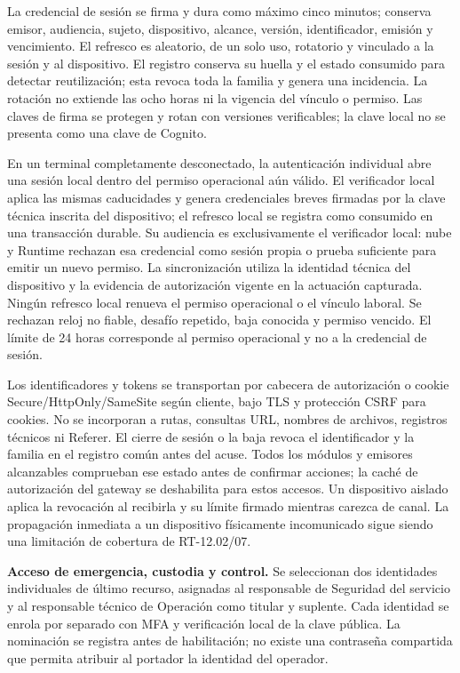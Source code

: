 La credencial de sesión se firma y dura como máximo cinco minutos; conserva emisor, audiencia, sujeto, dispositivo, alcance, versión, identificador, emisión y vencimiento. El refresco es aleatorio, de un solo uso, rotatorio y vinculado a la sesión y al dispositivo. El registro conserva su huella y el estado consumido para detectar reutilización; esta revoca toda la familia y genera una incidencia. La rotación no extiende las ocho horas ni la vigencia del vínculo o permiso. Las claves de firma se protegen y rotan con versiones verificables; la clave local no se presenta como una clave de Cognito.

En un terminal completamente desconectado, la autenticación individual abre una sesión local dentro del permiso operacional aún válido. El verificador local aplica las mismas caducidades y genera credenciales breves firmadas por la clave técnica inscrita del dispositivo; el refresco local se registra como consumido en una transacción durable. Su audiencia es exclusivamente el verificador local: nube y Runtime rechazan esa credencial como sesión propia o prueba suficiente para emitir un nuevo permiso. La sincronización utiliza la identidad técnica del dispositivo y la evidencia de autorización vigente en la actuación capturada. Ningún refresco local renueva el permiso operacional o el vínculo laboral. Se rechazan reloj no fiable, desafío repetido, baja conocida y permiso vencido. El límite de 24 horas corresponde al permiso operacional y no a la credencial de sesión.

Los identificadores y tokens se transportan por cabecera de autorización o cookie Secure/HttpOnly/SameSite según cliente, bajo TLS y protección CSRF para cookies. No se incorporan a rutas, consultas URL, nombres de archivos, registros técnicos ni Referer. El cierre de sesión o la baja revoca el identificador y la familia en el registro común antes del acuse. Todos los módulos y emisores alcanzables comprueban ese estado antes de confirmar acciones; la caché de autorización del gateway se deshabilita para estos accesos. Un dispositivo aislado aplica la revocación al recibirla y su límite firmado mientras carezca de canal. La propagación inmediata a un dispositivo físicamente incomunicado sigue siendo una limitación de cobertura de RT-12.02/07.

\textbf{Acceso de emergencia, custodia y control.}
Se seleccionan dos identidades individuales de último recurso, asignadas al responsable de Seguridad del servicio y al responsable técnico de Operación como titular y suplente. Cada identidad se enrola por separado con MFA y verificación local de la clave pública. La nominación se registra antes de habilitación; no existe una contraseña compartida que permita atribuir al portador la identidad del operador.


